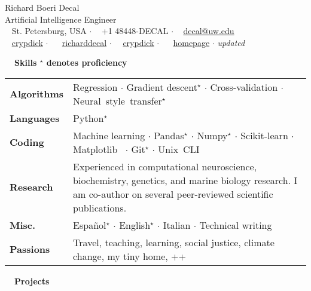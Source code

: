 \documentclass[a4paper,12pt]{article}
\newcommand{\resheading}[1]{{\vspace*{.06in} \colorbox{mygrey}{\begin{minipage}{\textwidth}{\textmd{\large \textbf{#1} \vphantom{p\^{E}}}}\end{minipage}}} }
\begin{document}
\begin{center}
{\Huge Richard Boeri Decal} \\
Artificial Intelligence Engineer \\
{\small \faMapMarker~ St. Petersburg, USA $\cdot$ \faPhone~ +1 48448-DECAL $\cdot$ \faEnvelope~ \href{mailto:decal@uw.edu}{decal@uw.edu}  \\ \faGithubAlt~ \href{https://github.com/crypdick}{crypdick}   $\cdot$ ~\faLinkedin~ \href{https://www.linkedin.com/in/richarddecal/}{richarddecal}  $\cdot$~\faStackOverflow~  \href{https://stackoverflow.com/users/4212158/crypdick}{crypdick} $\cdot$  ~\faHome~  \href{http://www.richarddecal.com}{homepage} $\cdot$ 
 \tiny{\textit{updated \Today}}}
\end{center}


\resheading{~~Skills \hfill {\small$^\star$ denotes proficiency}}
\begin{tabularx}{\textwidth}{p{3cm}>{\arraybackslash}X}
  \bfseries{Algorithms} & Regression  $\cdot$ Gradient descent$^\star$ $\cdot$ Cross-validation  $\cdot$ \mbox{Neural style transfer$^\star$} \\
  \bfseries{Languages} & Python$^\star$  \\
  \bfseries{Coding} & Machine learning  $\cdot$ Pandas$^\star$ $\cdot$ Numpy$^\star$ $\cdot$ Scikit-learn   $\cdot$ \mbox{Matplotlib  } $\cdot$ Git$^\star$ $\cdot$ \mbox{Unix CLI }  \\
  \bfseries{Research} &  Experienced in computational neuroscience, biochemistry, genetics, and marine biology research. I am co-author on several peer-reviewed scientific publications.\\
  \bfseries{Misc.} & Espa\~nol$^\star$ $\cdot$ English$^\star$ $\cdot$ Italian  $\cdot$ Technical writing  \\  %
  \bfseries{Passions} & Travel, teaching, learning, social justice, climate change, my tiny home, ++  \\
\end{tabularx}


\resheading{~~Projects}
\end{document}
